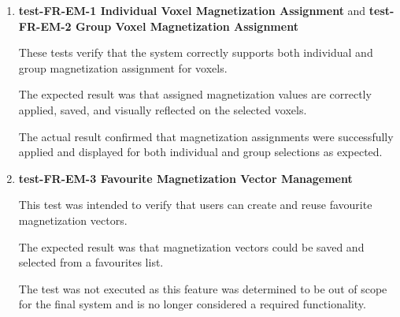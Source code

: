 \documentclass[12pt, titlepage]{article}
\begin{document}
\begin{enumerate}


\item \textbf{test-FR-EM-1 Individual Voxel Magnetization Assignment} and \textbf{test-FR-EM-2 Group Voxel Magnetization Assignment}

\hspace{1.5em} These tests verify that the system correctly supports both individual and group magnetization assignment for voxels.

The expected result was that assigned magnetization values are correctly applied, saved, and visually reflected on the selected voxels.

The actual result confirmed that magnetization assignments were successfully applied and displayed for both individual and group selections as expected.



\item \textbf{test-FR-EM-3 Favourite Magnetization Vector Management}

\hspace{1.5em} This test was intended to verify that users can create and reuse favourite magnetization vectors.

The expected result was that magnetization vectors could be saved and selected from a favourites list.

The test was not executed as this feature was determined to be out of scope for the final system and is no longer considered a required functionality.


\end{enumerate}
\end{document}
